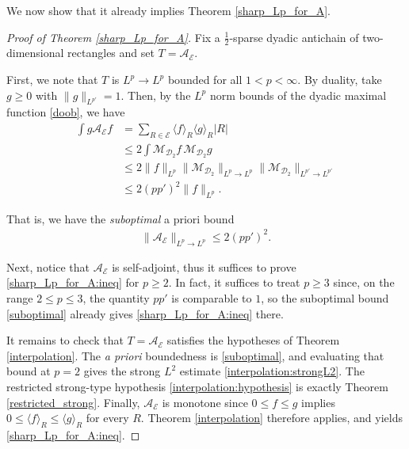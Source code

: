 \documentclass[oneside]{amsart}
\theoremstyle{definition}
\theoremstyle{plain}
\numberwithin{equation}{section}
\numberwithin{theorem}{section}
\begin{document}
We now show that it already implies Theorem \ref{sharp_Lp_for_A}.
\begin{proof}[Proof of Theorem \ref{sharp_Lp_for_A}]

  Fix a $\frac{1}{2}$-sparse dyadic antichain of two-dimensional
  rectangles and set $T = \mathcal{A}_{\mathcal{E}}$.

  First, we note that $T$ is $L^p \to L^p$ bounded for all $1 < p < \infty$.
  By duality, take $g \geq 0$ with $\|g\|_{L^{p'}} = 1$.
  Then, by the $L^p$ norm bounds of the dyadic maximal function \eqref{doob}, we
  have
  \begin{align*}
    \int g\mathcal{A}_{\mathcal{E}}f &= \sum_{R \in \mathcal{E}} \langle f
    \rangle_R \langle g \rangle_R |R| \\
    &\leq 2 \int \mathcal{M}_{\mathcal{D}_2}f \, \mathcal{M}_{\mathcal{D}_2}g \\
    &\leq 2 \|f\|_{L^p} \|\mathcal{M}_{\mathcal{D}_2}\|_{L^p \to L^p}
    \|\mathcal{M}_{\mathcal{D}_2}\|_{L^{p'} \to L^{p'}} \\
    &\leq 2(pp')^2 \|f\|_{L^p}.
  \end{align*}

  That is, we have the \emph{suboptimal} a priori bound
  \begin{align} \label{suboptimal}
    \|\mathcal{A}_{\mathcal{E}}\|_{L^p \to L^p} \leq 2(pp')^2.
  \end{align}

  Next, notice that $\mathcal{A}_{\mathcal{E}}$ is self-adjoint, thus it
  suffices to prove \eqref{sharp_Lp_for_A:ineq} for $p \geq 2$.
  In fact, it suffices to treat $p \geq 3$ since, on the range
  $2 \leq p \leq 3$, the quantity $pp'$ is comparable to $1$, so the suboptimal
  bound \eqref{suboptimal} already gives \eqref{sharp_Lp_for_A:ineq} there.

  It remains to check that $T = \mathcal{A}_{\mathcal{E}}$ satisfies the
  hypotheses of Theorem \ref{interpolation}.
  The \emph{a priori} boundedness is \eqref{suboptimal}, and evaluating that
  bound at $p=2$ gives the strong $L^2$ estimate \eqref{interpolation:strongL2}.
  The restricted strong-type hypothesis \eqref{interpolation:hypothesis} is
  exactly Theorem \ref{restricted_strong}.
  Finally, $\mathcal{A}_{\mathcal{E}}$ is monotone since $0 \leq f \leq g$
  implies $0 \leq \langle f \rangle_R \leq \langle g \rangle_R$ for every $R$.
  Theorem \ref{interpolation} therefore applies, and yields
  \eqref{sharp_Lp_for_A:ineq}.
\end{proof}
\end{document}
